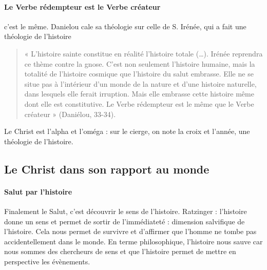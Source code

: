 \paragraph{Le Verbe rédempteur est le Verbe créateur} c'est le même. Danielou cale sa théologie sur celle de S. Irénée, qui a fait une théologie de l'histoire

\begin{quote}
    « L’histoire sainte constitue en réalité l’histoire totale (…). Irénée reprendra ce thème contre la gnose. C’est non seulement l’histoire humaine, mais la totalité de l’histoire cosmique que l’histoire du salut embrasse. Elle ne se situe pas à l’intérieur d’un  monde de la nature et d’une histoire naturelle, dans lesquels elle ferait irruption. Mais elle embrasse cette histoire même dont elle est constitutive. Le Verbe rédempteur est le même que le Verbe créateur » (Daniélou, 33-34). 
\end{quote}

Le Christ est l'alpha et l'oméga : sur le cierge, on note la croix et l'année, une théologie de l'histoire.

\subsection{Le Christ dans son rapport au monde}

\paragraph{Salut par l'histoire} Finalement le Salut, c'est découvrir le sens de l'histoire. Ratzinger : l'histoire donne un sens et permet de sortir de l'immédiateté : dimension salvifique de l'histoire. Cela nous permet de survivre et d'affirmer que l'homme ne tombe pas accidentellement dans le monde. En terme philosophique, l'histoire nous sauve car nous sommes des chercheurs de sens et que l'histoire permet de mettre en perspective les évènements.


